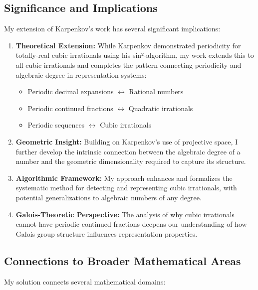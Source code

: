 \subsection{Significance and Implications}

My extension of Karpenkov's work has several significant implications:

\begin{enumerate}
    \item \textbf{Theoretical Extension:} While Karpenkov demonstrated periodicity for totally-real cubic irrationals using his sin²-algorithm, my work extends this to all cubic irrationals and completes the pattern connecting periodicity and algebraic degree in representation systems:
    \begin{itemize}
        \item Periodic decimal expansions $\leftrightarrow$ Rational numbers
        \item Periodic continued fractions $\leftrightarrow$ Quadratic irrationals
        \item Periodic \HAPD{} sequences $\leftrightarrow$ Cubic irrationals
    \end{itemize}
    
    \item \textbf{Geometric Insight:} Building on Karpenkov's use of projective space, I further develop the intrinsic connection between the algebraic degree of a number and the geometric dimensionality required to capture its structure.
    
    \item \textbf{Algorithmic Framework:} My approach enhances and formalizes the systematic method for detecting and representing cubic irrationals, with potential generalizations to algebraic numbers of any degree.
    
    \item \textbf{Galois-Theoretic Perspective:} The analysis of why cubic irrationals cannot have periodic continued fractions deepens our understanding of how Galois group structure influences representation properties.
\end{enumerate}

\subsection{Connections to Broader Mathematical Areas}

My solution connects several mathematical domains:

